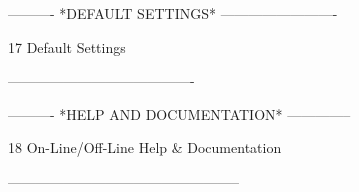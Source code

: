  
 
 
 
 
 
 
 
 
 
 
 
 
 
 
 
 
 
 
 
 
 
 
 
 
 
 
 
 
 
 
 
 
 
 
 
 
 
 
 
----------  *DEFAULT SETTINGS*  -------------------------
 
17
Default Settings
 
----------------------------------------
 
 
 
 
 
 
 
 
 
 
 
 
 
 
 
 
 
 
 
 
 
 
 
 
 
 
 
 
 
 
 
 
 
 
 
 
 
 
 
 
 
 
 
 
 
 
 
 
 
 
 
 
 
 
 
 
 
 
 
 
 
 
 
 
 
 
 
 
 
 
 
 
 
 
 
 
 
 
 
 
 
 
 
 
 
 
 
 
 
 
 
 
 
 
 
----------  *HELP AND DOCUMENTATION*  --------------
 
18
On-Line/Off-Line Help & Documentation
 
--------------------------------------------------
